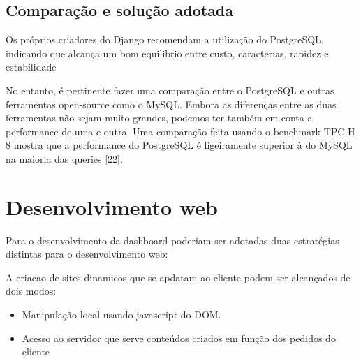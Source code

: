 


\subsection{Comparação e solução adotada}


Os próprios criadores do Django recomendam a utilização do PostgreSQL, indicando que alcança um bom equilibrio entre custo, caracterıas, rapidez e estabilidade




No entanto, é pertinente fazer uma comparação entre o PostgreSQL e
outras ferramentas open-source como o MySQL. Embora as diferenças entre
as duas ferramentas não sejam muito grandes, podemos ter também em conta
a performance de uma e outra. Uma comparação feita usando o benchmark
TPC-H 8 mostra que a performance do PostgreSQL é ligeiramente superior à
do MySQL na maioria das queries [22].



\newpage
\section{Desenvolvimento web}



Para o desenvolvimento da dashboard poderiam ser adotadas duas estratégias distintas para o desenvolvimento web: 


A criacao de sites dinamicos que se apdatam ao cliente podem ser alcançados de dois modos: 

\begin{itemize}
	\item Manipulação local usando javascript do DOM. 
	
	\item Acesso ao servidor que serve conteúdos criados em função dos pedidos do cliente
	
\end{itemize}



